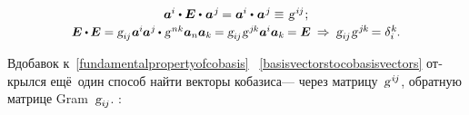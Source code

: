 \begin{otherlanguage}{russian}
\begin{equation}
\begin{array}{c}
\bm{a}^{\hspace{-0.05ex}i} \dotp \UnitDyad \dotp \hspace{.1ex} \bm{a}^{\hspace{.1ex}j} \hspace{-0.15ex} = \bm{a}^{\hspace{-0.05ex}i} \dotp \hspace{.1ex} \bm{a}^{\hspace{.1ex}j} \hspace{-0.15ex} \hspace{.1ex} \equiv \hspace{.16ex} \textsl{g}^{\hspace{0.2ex}i\hspace{-0.1ex}j} \hspace{.1ex} ;
\\[0.2em]
%
\scalebox{0.96}[0.97]{$\UnitDyad \dotp \hspace{-0.1ex} \UnitDyad = \textsl{g}_{i\hspace{-0.1ex}j} \hspace{.1ex} \bm{a}^{\hspace{-0.05ex}i} \hspace{-0.1ex} \bm{a}^{\hspace{0.05ex}j} \hspace{-0.1ex} \dotp \hspace{.1ex} \textsl{g}^{\hspace{0.2ex}nk} \bm{a}_n \bm{a}_k \hspace{-0.1ex} = \textsl{g}_{i\hspace{-0.1ex}j} \hspace{.1ex} \textsl{g}^{\hspace{0.2ex}j\hspace{-0.1ex}k} \bm{a}^{\hspace{-0.05ex}i} \bm{a}_k \hspace{-0.1ex} = \UnitDyad$}
\:\Rightarrow\: \textsl{g}_{i\hspace{-0.1ex}j} \hspace{.1ex} \textsl{g}^{\hspace{.2ex}j\hspace{-0.1ex}k} \hspace{-0.25ex} = \delta_i^{\hspace{0.05ex}k} \hspace{-0.1ex}.
\end{array}\end{equation}

\vspace{.1em}\noindent
Вдобавок к~\eqref{fundamentalpropertyofcobasis}
~\eqref{basisvectorstocobasisvectors}
открылся ещё~один способ найти векторы кобазиса\:---
через матрицу~\hbox{$\textsl{g}^{\hspace{.2ex}i\hspace{-0.1ex}j}$\hspace{-0.3ex}},
обратную матрице Gram~${\textsl{g}_{i\hspace{-0.1ex}j}}$.
\::


\end{otherlanguage}
